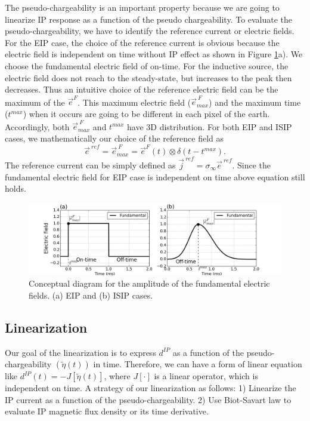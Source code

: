 \documentclass[a4paper, 11pt]{article}
\newcommand{\siginf}{\sigma_\infty}
\renewcommand {\j}  { {\vec j} }
\newcommand {\e}  { {\vec e} }
\newcommand{\peta}{\tilde{\eta}}
\newcommand{\eFmax}{\e^{\ F}_{max}}
\newcommand{\eref}{\e^{\ ref}}
\newcommand{\dip}{d^{IP}}
\begin{document}
The pseudo-chargeability is an important property because we are going to linearize IP response as a function of the pseudo chargeability. 
To evaluate the pseudo-chargeability, we have to identify the reference current or electric fields. 
For the EIP case, the choice of the reference current is obvious because the electric field is independent on time without IP effect as shown in Figure \ref{F:DCEM_F_current}a). 
We choose the fundamental electric field of on-time. 
For the inductive source, the electric field does not reach to the steady-state, but increases to the peak then decreases. Thus an intuitive choice of the reference electric field can be the maximum of the $\e^{F}$. This maximum electric field ($\eFmax$) and the maximum time ($t^{max}$) when it occurs are going to be different in each pixel of the earth. 
Accordingly, both $\eFmax$ and $t^{max}$ have 3D distribution. 
For both EIP and ISIP cases, we mathematically our choice of the reference field as
\begin{equation}
  \eref = \eFmax = \e^{F}(t) \otimes \delta(t-t^{max}). 
\end{equation}
The reference current can be simply defined as $\j^{\ ref}  = \siginf \eref$. 
Since the fundamental electric field for EIP case is independent on time above equation still holds. 

\begin{figure}
  \centering  
  \includegraphics[width=1.0\textwidth]{figures/DCEM_F_current.png}
  \caption{Conceptual diagram for the amplitude of the fundamental electric fields. (a) EIP and (b) ISIP cases.}
  \label{F:DCEM_F_current}
\end{figure}
  


\subsection{Linearization}
Our goal of the linearization is to express $\dip$ as a function of the pseudo-chargeability $(\peta(t))$ in time. 
Therefore, we can have a form of linear equation like $\dip(t) = -J[\peta(t)]$, where $J[\cdot]$ is a linear operator, which is independent on time. 
A strategy of our linearization as follows: 1) Linearize the IP current as a function of the pseudo-chargeability. 2) Use Biot-Savart law to evaluate IP magnetic flux density or its time derivative. 
\end{document}
